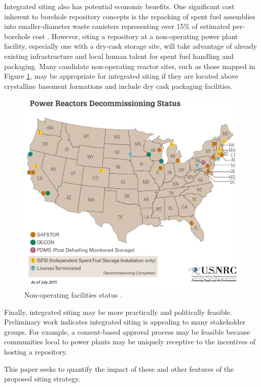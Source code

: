 Integrated siting also has potential economic benefits. One significant cost 
inherent to borehole repository concepts is the repacking of spent fuel 
assemblies into smaller-diameter waste canisters representing over 15\% of 
estimated per-borehole cost \cite{arnold_reference_2011}.  However, siting a 
repository at a non-operating power plant facility, especially one with a 
dry-cask storage site, will take advantage of already existing infrastructure 
and local human talent for spent fuel handling and packaging. Many candidate 
non-operating reactor sites, such as those mapped in Figure \ref{fig:shutdown}, 
may be appropriate for integrated siting if they are located above crystalline 
basement formations and include dry cask packaging facilities.

\begin{figure}[htpb!] 
  \centering
  \includegraphics[width=0.8\columnwidth]{power-reactors-decommissioning}	
  \caption{Non-operating facilities status
  \cite{nuclear_regulatory_commission_nrc_2015}.}
  \label{fig:shutdown}
\end{figure}

Finally, integrated siting may be more practically and politically feasible. 
Preliminary work \cite{waleed_regional_2015} indicates integrated siting is 
appealing to many stakeholder groups. For example, a consent-based approval 
process may be feasible because communities local to power plants may be 
uniquely receptive to the incentives of hosting a repository. 

This paper seeks to quantify the impact of these and other features of the 
proposed siting strategy. 


